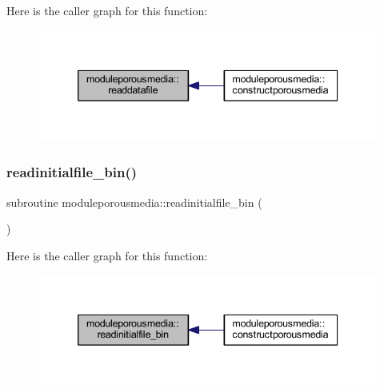 Here is the caller graph for this function\+:\nopagebreak
\begin{figure}[H]
\begin{center}
\leavevmode
\includegraphics[width=339pt]{namespacemoduleporousmedia_a00f10b641a285b482aecd0a0d9289ed7_icgraph}
\end{center}
\end{figure}
\mbox{\label{namespacemoduleporousmedia_ad218337265b17e54150c2a4447473293}} 
\subsubsection{\texorpdfstring{readinitialfile\+\_\+bin()}{readinitialfile\_bin()}}
{\footnotesize\ttfamily subroutine moduleporousmedia\+::readinitialfile\+\_\+bin (\begin{DoxyParamCaption}{ }\end{DoxyParamCaption})\hspace{0.3cm}{\ttfamily [private]}}

Here is the caller graph for this function\+:\nopagebreak
\begin{figure}[H]
\begin{center}
\leavevmode
\includegraphics[width=339pt]{namespacemoduleporousmedia_ad218337265b17e54150c2a4447473293_icgraph}
\end{center}
\end{figure}
\mbox{\label{namespacemoduleporousmedia_ad6fc7e9521189f7f68bcd991a1724a96}} 
